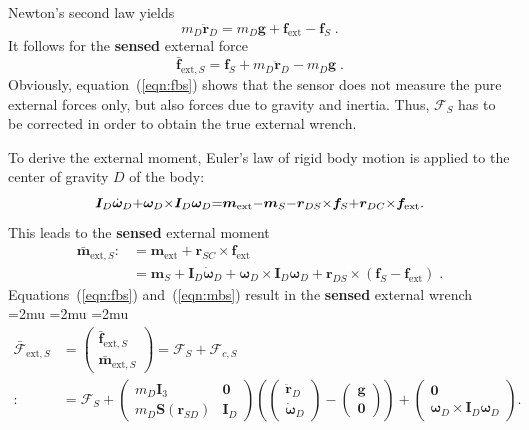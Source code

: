%
Newton's second law yields
\begin{equation}
m_D\ddot{\bm{r}}_D=m_D\bm{g}+\bm{f}_\mathrm{ext}-\bm{f}_S\;.
\end{equation}
%
It follows for the \textbf{sensed} external force
%
\begin{equation}
\bar{\bm{f}}_{\mathrm{ext},S}=\bm{f}_S+m_D\ddot{\bm{r}}_D-m_D\bm{g}\;.\label{eqn:fbs}
\end{equation}
%
Obviously, equation~(\ref{eqn:fbs}) shows that the sensor does not measure the pure external forces only, but also forces due to gravity and inertia.
Thus, $\bm{\mathcal{F}}_S$ has to be corrected in order to obtain the true external wrench.

To derive the external moment, Euler's law of rigid body motion is applied to the center of gravity $D$ of the body:
%
\begin{equation}%
\medmuskip=0mu
\thinmuskip=0mu
\thickmuskip=0mu
\bm{I}_{D}\dot{\bm{\omega}}_D+\bm{\omega}_D\times \bm{I}_{D}\bm{\omega}_D=\bm{m}_{\mathrm{ext}}-\bm{m}_S-\bm{r}_{DS}\times\bm{f}_S+\bm{r}_{DC}\times\bm{f}_\mathrm{ext}\;.\label{eqn:mbs}
\end{equation}
%
This leads to the \textbf{sensed} external moment
%
\begingroup
\small
\begin{align}
\bar{\bm{m}}_{\mathrm{ext},S}:&=
\bm{m}_{\mathrm{ext}}+\bm{r}_{SC}\times\bm{f}_\mathrm{ext}\nonumber\\&=
\bm{m}_S+\bm{I}_{D}\dot{\bm{\omega}}_D+\bm{\omega}_D\times \bm{I}_{D}\bm{\omega}_D+\bm{r}_{DS}\times(\bm{f}_S-\bm{f}_\mathrm{ext})\;.
\end{align}
\endgroup
%
Equations~(\ref{eqn:fbs}) and~(\ref{eqn:mbs}) result in the \textbf{sensed} external wrench 
%
\begingroup %
\medmuskip=2mu
\thinmuskip=2mu
\thickmuskip=2mu
\small
\begin{align}
\bar{\bm{\mathcal{F}}}_{\mathrm{ext},S}&=\begin{pmatrix}
\bar{\bm{f}}_{\mathrm{ext},S}\\\bar{\bm{m}}_{\mathrm{ext},S}\nonumber
\end{pmatrix}=\bm{\mathcal{F}}_{S}+\bm{\mathcal{F}}_{c,S}\\
:&=\bm{\mathcal{F}}_S+\left(\begin{smallmatrix}
m_D\bm{I}_3 & \bm{0}\\
m_D\bm{S}(\bm{r}_{SD}) & \bm{I}_{D}
\end{smallmatrix}\right)
\left(\left(\begin{smallmatrix}\ddot{\bm{r}}_D\\\dot{\bm{\omega}}_D\end{smallmatrix}\right)-\left(\begin{smallmatrix}
\bm{g}\\\bm{0}
\end{smallmatrix}\right)\right)+\left(\begin{smallmatrix}
\bm{0}\\
\bm{\omega}_D\times\bm{I}_{D}\bm{\omega}_D
\end{smallmatrix}\right).\label{eqn:ext_wrench}
\end{align}
